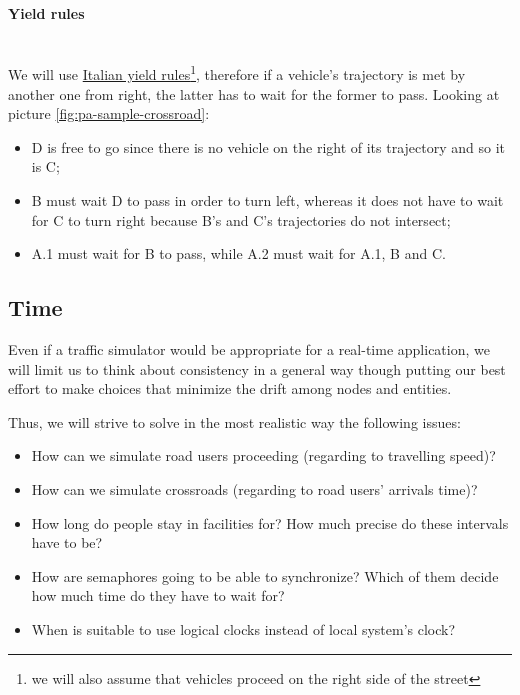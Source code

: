 \paragraph{Yield rules} \mbox{} \\

We will use \href{http://www.aci.it/i-servizi/normative/codice-della-strada/titolo-v-norme-di-comportamento/art-145-precedenza.html}{Italian yield rules}\footnote{we will also assume that vehicles proceed on the right side of the
street}, therefore if a vehicle's trajectory is met by another one from right,
the latter has to wait for the former to pass.
Looking at picture \ref{fig:pa-sample-crossroad}:
\begin{itemize}
    \item D is free to go since there is no vehicle on the right of its trajectory and so it is C;
    \item B must wait D to pass in order to turn left, whereas it does not have to wait
for C to turn right because B's and C's trajectories do not intersect;
    \item A.1 must wait for B to pass, while A.2 must wait for A.1, B and C.
\end{itemize}


\subsection{Time}
Even if a traffic simulator would be appropriate for a real-time application,
we will limit us to think about consistency in a general way though putting our
best effort to make choices that minimize the drift among nodes and entities.

Thus, we will strive to solve in the most realistic way the following issues:

\begin{itemize}
\item How can we simulate road users proceeding (regarding to travelling
  speed)?
\item How can we simulate crossroads (regarding to road users' arrivals time)?
\item How long do people stay in facilities for? How much precise do these
  intervals have to be?
\item How are semaphores going to be able to synchronize? Which of them decide
  how much time do they have to wait for?
\item When is suitable to use logical clocks instead of local system's clock?
\end{itemize}
